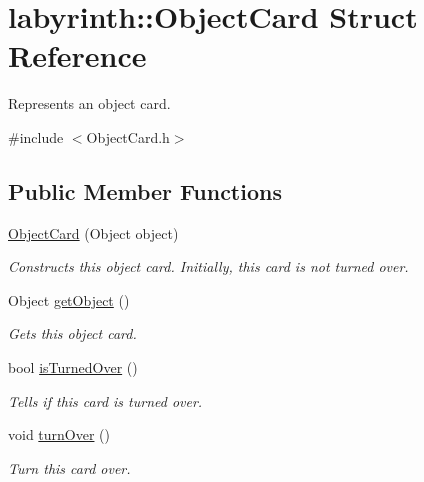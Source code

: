 \hypertarget{structlabyrinth_1_1_object_card}{}\section{labyrinth\+::Object\+Card Struct Reference}
\label{structlabyrinth_1_1_object_card}


Represents an object card.  




{\ttfamily \#include $<$Object\+Card.\+h$>$}

\subsection*{Public Member Functions}
\begin{DoxyCompactItemize}
\item 
\mbox{\hyperlink{structlabyrinth_1_1_object_card_a02eb46ffcf12f68b81e288aa9366f9ec}{Object\+Card}} (Object object)
\begin{DoxyCompactList}\small\item\em Constructs this object card. Initially, this card is not turned over. \end{DoxyCompactList}\item 
Object \mbox{\hyperlink{structlabyrinth_1_1_object_card_a50df49093ec7c8ffa46b5d5c3fc85562}{get\+Object}} ()
\begin{DoxyCompactList}\small\item\em Gets this object card. \end{DoxyCompactList}\item 
bool \mbox{\hyperlink{structlabyrinth_1_1_object_card_a488afb4284b53eba66780a67863cef41}{is\+Turned\+Over}} ()
\begin{DoxyCompactList}\small\item\em Tells if this card is turned over. \end{DoxyCompactList}\item 
\mbox{\label{structlabyrinth_1_1_object_card_a7f4f0019c4a42b7b77fd695a475b126a}} 
void \mbox{\hyperlink{structlabyrinth_1_1_object_card_a7f4f0019c4a42b7b77fd695a475b126a}{turn\+Over}} ()
\begin{DoxyCompactList}\small\item\em Turn this card over. \end{DoxyCompactList}\end{DoxyCompactItemize}
